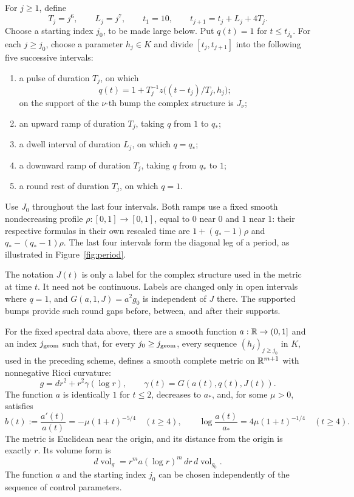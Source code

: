 For \(j\geq1\), define
\begin{equation}\label{eq:periods}
 T_j=j^6,\qquad L_j=j^7,\qquad t_1=10,\qquad
 t_{j+1}=t_j+L_j+4T_j.
\end{equation}
Choose a starting index \(j_0\), to be made large below.
Put \(q(t)=1\) for \(t\leq t_{j_0}\).
For each \(j\geq j_0\), choose a parameter \(h_j\in K\) and divide
\([t_j,t_{j+1}]\) into the following five successive intervals:
\begin{enumerate}
 \item a pulse of duration \(T_j\), on which
 \[
  q(t)=1+T_j^{-1}z\bigl((t-t_j)/T_j,h_j\bigr);
 \]
 on the support of the \(\nu\)-th bump the complex structure is
 \(J_\nu\);
 \item an upward ramp of duration \(T_j\), taking \(q\) from \(1\)
 to \(q_*\);
 \item a dwell interval of duration \(L_j\), on which \(q=q_*\);
 \item a downward ramp of duration \(T_j\), taking \(q\) from
 \(q_*\) to \(1\);
 \item a round rest of duration \(T_j\), on which \(q=1\).
\end{enumerate}
Use \(J_0\) throughout the last four intervals.
Both ramps use a fixed smooth nondecreasing profile
\(\rho:[0,1]\to[0,1]\), equal to \(0\) near \(0\) and \(1\) near
\(1\): their respective formulas in their own rescaled time are
\(1+(q_*-1)\rho\) and \(q_*-(q_*-1)\rho\).
The last four intervals form the diagonal leg of a period, as
illustrated in Figure~\ref{fig:period}.



The notation \(J(t)\) is only a label for the complex structure used
in the metric at time \(t\).  It need not be continuous.
Labels are changed only in open intervals where \(q=1\), and
\(G(a,1,J)=a^2g_0\) is independent of \(J\) there.
The supported bumps provide such round gaps before, between, and
after their supports.

\begin{proposition}\label{prop:metric}
For the fixed spectral data above, there are a smooth function
\(a:\mathbb R\to(0,1]\) and an index \(j_{\rm geom}\) such that, for every
\(j_0\geq j_{\rm geom}\), every sequence
\((h_j)_{j\geq j_0}\) in \(K\), used in the preceding scheme, defines
a smooth complete metric on \(\mathbb R^{m+1}\) with nonnegative Ricci
curvature:
\[
 g=dr^2+r^2\gamma(\log r),\qquad
 \gamma(t)=G(a(t),q(t),J(t)).
\]
The function \(a\) is identically \(1\) for \(t\leq2\), decreases to
\(a_*\), and, for some \(\mu>0\), satisfies
\begin{equation}\label{eq:scale-tail}
 b(t):=\frac{a'(t)}{a(t)}
       =-\mu(1+t)^{-5/4}\quad(t\geq4),
 \qquad
 \log\frac{a(t)}{a_*}=4\mu(1+t)^{-1/4}\quad(t\geq4).
\end{equation}
The metric is Euclidean near the origin, and its distance from the
origin is exactly \(r\).
Its volume form is
\[
 d\operatorname{vol}_g
   =r^m a(\log r)^m\,dr\,d\operatorname{vol}_{g_0}.
\]
The function \(a\) and the starting index \(j_0\) can be chosen
independently of the sequence of control parameters.
\end{proposition}


